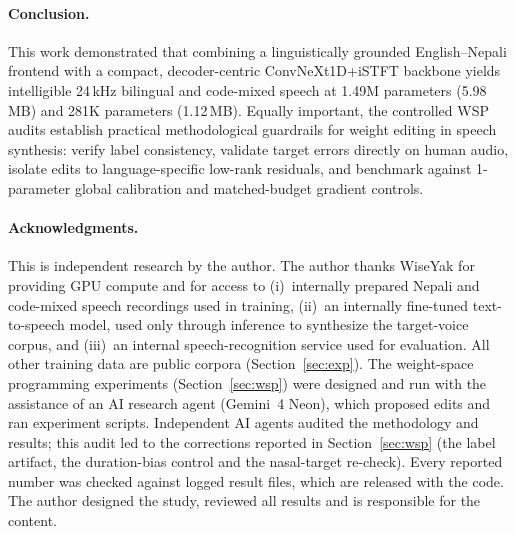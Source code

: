 \paragraph{Conclusion.}
This work demonstrated that combining a linguistically grounded English--Nepali frontend with a compact, decoder-centric ConvNeXt1D+iSTFT backbone yields intelligible 24\,kHz bilingual and code-mixed speech at 1.49M parameters (5.98\,MB) and 281K parameters (1.12\,MB). Equally important, the controlled WSP audits establish practical methodological guardrails for weight editing in speech synthesis: verify label consistency, validate target errors directly on human audio, isolate edits to language-specific low-rank residuals, and benchmark against 1-parameter global calibration and matched-budget gradient controls.

\paragraph{Acknowledgments.}
This is independent research by the author. The author thanks WiseYak for providing GPU compute and for access to (i)~internally prepared Nepali and code-mixed speech recordings used in training, (ii)~an internally fine-tuned text-to-speech model, used only through inference to synthesize the target-voice corpus, and (iii)~an internal speech-recognition service used for evaluation. All other training data are public corpora (Section~\ref{sec:exp}). The weight-space programming experiments (Section~\ref{sec:wsp}) were designed and run with the assistance of an AI research agent (Gemini~4 Neon), which proposed edits and ran experiment scripts. Independent AI agents audited the methodology and results; this audit led to the corrections reported in Section~\ref{sec:wsp} (the label artifact, the duration-bias control and the nasal-target re-check). Every reported number was checked against logged result files, which are released with the code. The author designed the study, reviewed all results and is responsible for the content.
